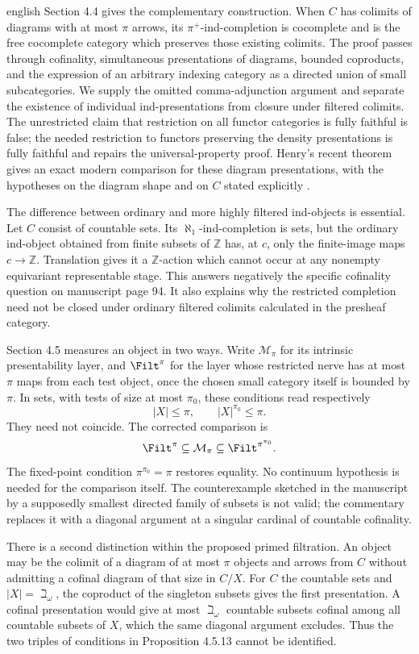 \begin{otherlanguage*}{english}
Section 4.4 gives the complementary construction. When $C$ has colimits of diagrams with at most $\pi$ arrows, its $\pi^+$-ind-completion is cocomplete and is the free cocomplete category which preserves those existing colimits. The proof passes through cofinality, simultaneous presentations of diagrams, bounded coproducts, and the expression of an arbitrary indexing category as a directed union of small subcategories. We supply the omitted comma-adjunction argument and separate the existence of individual ind-presentations from closure under filtered colimits. The unrestricted claim that restriction on all functor categories is fully faithful is false; the needed restriction to functors preserving the density presentations is fully faithful and repairs the universal-property proof. Henry's recent theorem gives an exact modern comparison for these diagram presentations, with the hypotheses on the diagram shape and on $C$ stated explicitly \citep{Henry2025}.

The difference between ordinary and more highly filtered ind-objects is essential. Let $C$ consist of countable sets. Its $\aleph_1$-ind-completion is sets, but the ordinary ind-object obtained from finite subsets of $\mathbb Z$ has, at $c$, only the finite-image maps $c\to\mathbb Z$. Translation gives it a $\mathbb Z$-action which cannot occur at any nonempty equivariant representable stage. This answers negatively the specific cofinality question on manuscript page 94. It also explains why the restricted completion need not be closed under ordinary filtered colimits calculated in the presheaf category.

Section 4.5 measures an object in two ways. Write $\mathcal M_\pi$ for its intrinsic presentability layer, and $\Filt^\pi$ for the layer whose restricted nerve has at most $\pi$ maps from each test object, once the chosen small category itself is bounded by $\pi$. In sets, with tests of size at most $\pi_0$, these conditions read respectively
\[
 |X|\leq\pi,
 \qquad |X|^{\pi_0}\leq\pi.
\]
They need not coincide. The corrected comparison is
\[
 \Filt^\pi\subseteq\mathcal M_\pi
        \subseteq\Filt^{\pi^{\pi_0}}.
\]
The fixed-point condition $\pi^{\pi_0}=\pi$ restores equality. No continuum hypothesis is needed for the comparison itself. The counterexample sketched in the manuscript by a supposedly smallest directed family of subsets is not valid; the commentary replaces it with a diagonal argument at a singular cardinal of countable cofinality.

There is a second distinction within the proposed primed filtration. An object may be the colimit of a diagram of at most $\pi$ objects and arrows from $C$ without admitting a cofinal diagram of that size in $C/X$. For $C$ the countable sets and $|X|=\beth_\omega$, the coproduct of the singleton subsets gives the first presentation. A cofinal presentation would give at most $\beth_\omega$ countable subsets cofinal among all countable subsets of $X$, which the same diagonal argument excludes. Thus the two triples of conditions in Proposition 4.5.13 cannot be identified.


\end{otherlanguage*}
